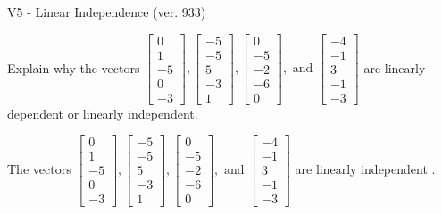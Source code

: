\begin{exercise}
  \begin{exerciseTitle}V5 - Linear Independence (ver. 933)\end{exerciseTitle}
  \begin{exerciseStatement}
    Explain why the vectors \(\left[\begin{array}{r}
0 \\
1 \\
-5 \\
0 \\
-3
\end{array}\right] , \left[\begin{array}{r}
-5 \\
-5 \\
5 \\
-3 \\
1
\end{array}\right] , \left[\begin{array}{r}
0 \\
-5 \\
-2 \\
-6 \\
0
\end{array}\right] , \text{ and } \left[\begin{array}{r}
-4 \\
-1 \\
3 \\
-1 \\
-3
\end{array}\right]\) are linearly dependent or linearly independent.	


  \end{exerciseStatement}
  \begin{exerciseAnswer}
   The vectors \(\left[\begin{array}{r}
0 \\
1 \\
-5 \\
0 \\
-3
\end{array}\right] , \left[\begin{array}{r}
-5 \\
-5 \\
5 \\
-3 \\
1
\end{array}\right] , \left[\begin{array}{r}
0 \\
-5 \\
-2 \\
-6 \\
0
\end{array}\right] , \text{ and } \left[\begin{array}{r}
-4 \\
-1 \\
3 \\
-1 \\
-3
\end{array}\right]\) are 
  	 linearly independent  .
  


  \end{exerciseAnswer}
\end{exercise}